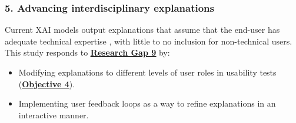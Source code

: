 
\subsubsection*{5. Advancing interdisciplinary explanations}
Current XAI models output explanations that assume that the end-user has adequate technical expertise \citep{greco2023explaining}, with little to no inclusion for non-technical users. This study responds to \hyperref[research-gap-9]{\uline{\textbf{Research Gap 9}}} by:

\begin{itemize}
  \item Modifying explanations to different levels of user roles in usability tests (\hyperref[objective-4]{\uline{\textbf{Objective 4}}}).
  \item Implementing user feedback loops as a way to refine explanations in an interactive manner.
\end{itemize}
